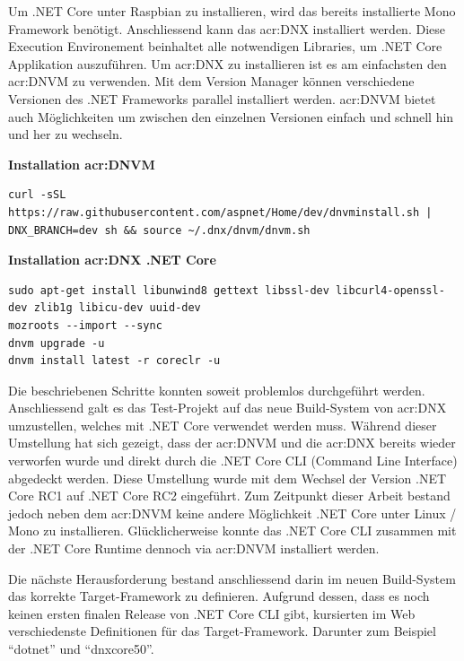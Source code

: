 Um .NET Core unter Raspbian zu installieren, wird das bereits installierte Mono Framework benötigt. Anschliessend kann das \gls{acr:DNX} installiert werden. Diese Execution Environement beinhaltet alle notwendigen Libraries, um .NET Core Applikation auszuführen. Um  \gls{acr:DNX} zu installieren ist es am einfachsten den \gls{acr:DNVM} zu verwenden. Mit dem Version Manager können verschiedene Versionen des .NET Frameworks parallel installiert werden. \gls{acr:DNVM} bietet auch Möglichkeiten um zwischen den einzelnen Versionen einfach und schnell hin und her zu wechseln.

\textbf{Installation \gls{acr:DNVM}} \\
\begin{lstlisting}
curl -sSL https://raw.githubusercontent.com/aspnet/Home/dev/dnvminstall.sh | DNX_BRANCH=dev sh && source ~/.dnx/dnvm/dnvm.sh
\end{lstlisting}

\textbf{Installation  \gls{acr:DNX} .NET Core} \\
\begin{lstlisting}
sudo apt-get install libunwind8 gettext libssl-dev libcurl4-openssl-dev zlib1g libicu-dev uuid-dev
mozroots --import --sync
dnvm upgrade -u
dnvm install latest -r coreclr -u
\end{lstlisting}

Die beschriebenen Schritte konnten soweit problemlos durchgeführt werden. Anschliessend galt es das Test-Projekt auf das neue Build-System von  \gls{acr:DNX} umzustellen, welches mit .NET Core verwendet werden muss. Während dieser Umstellung hat sich gezeigt, dass der \gls{acr:DNVM} und die  \gls{acr:DNX} bereits wieder verworfen wurde und direkt durch die .NET Core CLI (Command Line Interface) abgedeckt werden\footnotemark[1]. Diese Umstellung wurde mit dem Wechsel der Version .NET Core RC1 auf .NET Core RC2 eingeführt. Zum Zeitpunkt dieser Arbeit bestand jedoch neben dem \gls{acr:DNVM} keine andere Möglichkeit .NET Core unter Linux / Mono zu installieren. Glücklicherweise konnte das .NET Core CLI zusammen mit der .NET Core Runtime dennoch via \gls{acr:DNVM} installiert werden.


Die nächste Herausforderung bestand anschliessend darin im neuen Build-System das korrekte Target-Framework zu definieren. Aufgrund dessen, dass es noch keinen ersten finalen Release von .NET Core CLI gibt, kursierten im Web verschiedenste Definitionen für das Target-Framework. Darunter zum Beispiel "`dotnet"' und "`dnxcore50"'.

